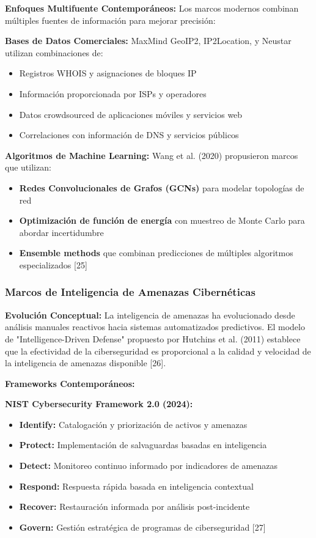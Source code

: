 \textbf{Enfoques Multifuente Contemporáneos:}
Los marcos modernos combinan múltiples fuentes de información para mejorar precisión:

\textbf{Bases de Datos Comerciales:} MaxMind GeoIP2, IP2Location, y Neustar utilizan combinaciones de:
\begin{itemize}
    \item Registros WHOIS y asignaciones de bloques IP
    \item Información proporcionada por ISPs y operadores
    \item Datos crowdsourced de aplicaciones móviles y servicios web
    \item Correlaciones con información de DNS y servicios públicos
\end{itemize}

\textbf{Algoritmos de Machine Learning:} Wang et al. (2020) propusieron marcos que utilizan:
\begin{itemize}
    \item \textbf{Redes Convolucionales de Grafos (GCNs)} para modelar topologías de red
    \item \textbf{Optimización de función de energía} con muestreo de Monte Carlo para abordar incertidumbre
    \item \textbf{Ensemble methods} que combinan predicciones de múltiples algoritmos especializados [25]
\end{itemize}

\subsubsection{Marcos de Inteligencia de Amenazas Cibernéticas}

\textbf{Evolución Conceptual:}
La inteligencia de amenazas ha evolucionado desde análisis manuales reactivos hacia sistemas automatizados predictivos. El modelo de "Intelligence-Driven Defense" propuesto por Hutchins et al. (2011) establece que la efectividad de la ciberseguridad es proporcional a la calidad y velocidad de la inteligencia de amenazas disponible [26].

\textbf{Frameworks Contemporáneos:}

\textbf{NIST Cybersecurity Framework 2.0 (2024):}
\begin{itemize}
    \item \textbf{Identify:} Catalogación y priorización de activos y amenazas
    \item \textbf{Protect:} Implementación de salvaguardas basadas en inteligencia
    \item \textbf{Detect:} Monitoreo continuo informado por indicadores de amenazas
    \item \textbf{Respond:} Respuesta rápida basada en inteligencia contextual
    \item \textbf{Recover:} Restauración informada por análisis post-incidente
    \item \textbf{Govern:} Gestión estratégica de programas de ciberseguridad [27]
\end{itemize}

